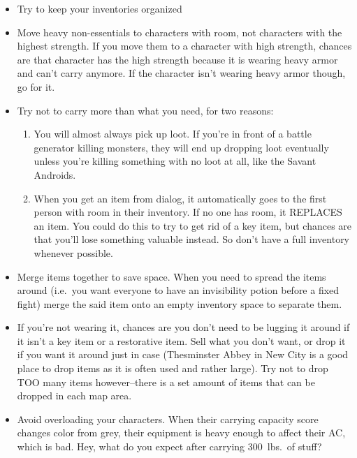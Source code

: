 \documentclass[12pt]{article}
\providecommand{\tightlist}{%
  \setlength{\itemsep}{0pt}\setlength{\parskip}{0pt}}
\newcommand{\indexPlace}[1]{\index{#1}}
\newcommand{\place}[1]{#1\indexPlace{#1}}
\begin{document}
\begin{itemize}
\tightlist
\item
  Try to keep your inventories organized
\item
  Move heavy non-essentials to characters with room, not characters with
  the highest strength. If you move them to a character with high
  strength, chances are that character has the high strength because it
  is wearing heavy armor and can't carry anymore. If the character isn't
  wearing heavy armor though, go for it.
\item
  Try not to carry more than what you need, for two reasons:

  \begin{enumerate}
  \def\labelenumi{\arabic{enumi}.}
  \tightlist
  \item
    You will almost always pick up loot. If you're in front of a battle
    generator killing monsters, they will end up dropping loot
    eventually unless you're killing something with no loot at all, like
    the Savant Androids.
  \item
    When you get an item from dialog, it automatically goes to the first
    person with room in their inventory. If no one has room, it REPLACES
    an item. You could do this to try to get rid of a key item, but
    chances are that you'll lose something valuable instead. So don't
    have a full inventory whenever possible.
  \end{enumerate}
\item
  Merge items together to save space. When you need to spread the items
  around (i.e.~you want everyone to have an invisibility potion before a
  fixed fight) merge the said item onto an empty inventory space to
  separate them.
\item
  If you're not wearing it, chances are you don't need to be lugging it
  around if it isn't a key item or a restorative item. Sell what you
  don't want, or drop it if you want it around just in case (Thesminster
  Abbey in \place{New City} is a good place to drop items as it is often used
  and rather large). Try not to drop TOO many items however--there is a
  set amount of items that can be dropped in each map area.
\item
  Avoid overloading your characters. When their carrying capacity score
  changes color from grey, their equipment is heavy enough to affect their
  AC, which is bad. Hey, what do you expect after carrying 300~lbs.\ of
  stuff?
\end{itemize}
\end{document}
